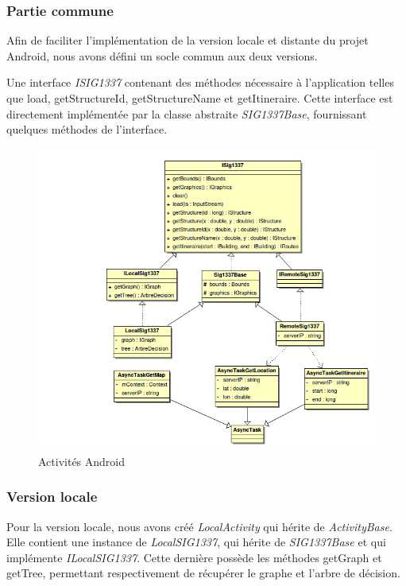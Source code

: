 
\subsubsection{Partie commune}

Afin de faciliter l'implémentation de la version locale et distante du projet Android,
nous avons défini un socle commun aux deux versions.

Une interface \textit{ISIG1337} contenant des méthodes nécessaire à l'application telles que load,
getStructureId, getStructureName et getItineraire.
Cette interface est directement implémentée par la classe abstraite \textit{SIG1337Base},
fournissant quelques méthodes de l'interface.

\begin{figure}[H]
\includegraphics[width=1\textwidth]{../images/androidSIG.png}
\caption{Activités Android}
\end{figure}


\subsubsection{Version locale}

Pour la version locale, nous avons créé \textit{LocalActivity} qui hérite de \textit{ActivityBase}.
Elle contient une instance de \textit{LocalSIG1337}, qui hérite de \textit{SIG1337Base} et qui implémente \textit{ILocalSIG1337}.
Cette dernière possède les méthodes getGraph et getTree, permettant respectivement de récupérer le graphe et l'arbre de décision.

